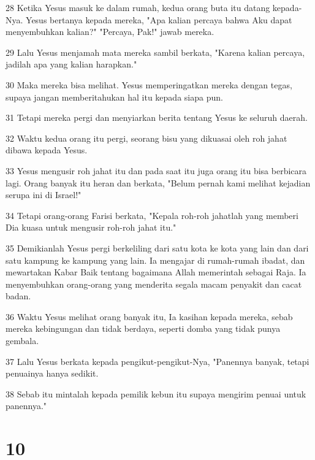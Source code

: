 \par 28 Ketika Yesus masuk ke dalam rumah, kedua orang buta itu datang kepada-Nya. Yesus bertanya kepada mereka, "Apa kalian percaya bahwa Aku dapat menyembuhkan kalian?" "Percaya, Pak!" jawab mereka.
\par 29 Lalu Yesus menjamah mata mereka sambil berkata, "Karena kalian percaya, jadilah apa yang kalian harapkan."
\par 30 Maka mereka bisa melihat. Yesus memperingatkan mereka dengan tegas, supaya jangan memberitahukan hal itu kepada siapa pun.
\par 31 Tetapi mereka pergi dan menyiarkan berita tentang Yesus ke seluruh daerah.
\par 32 Waktu kedua orang itu pergi, seorang bisu yang dikuasai oleh roh jahat dibawa kepada Yesus.
\par 33 Yesus mengusir roh jahat itu dan pada saat itu juga orang itu bisa berbicara lagi. Orang banyak itu heran dan berkata, "Belum pernah kami melihat kejadian serupa ini di Israel!"
\par 34 Tetapi orang-orang Farisi berkata, "Kepala roh-roh jahatlah yang memberi Dia kuasa untuk mengusir roh-roh jahat itu."
\par 35 Demikianlah Yesus pergi berkeliling dari satu kota ke kota yang lain dan dari satu kampung ke kampung yang lain. Ia mengajar di rumah-rumah ibadat, dan mewartakan Kabar Baik tentang bagaimana Allah memerintah sebagai Raja. Ia menyembuhkan orang-orang yang menderita segala macam penyakit dan cacat badan.
\par 36 Waktu Yesus melihat orang banyak itu, Ia kasihan kepada mereka, sebab mereka kebingungan dan tidak berdaya, seperti domba yang tidak punya gembala.
\par 37 Lalu Yesus berkata kepada pengikut-pengikut-Nya, "Panennya banyak, tetapi penuainya hanya sedikit.
\par 38 Sebab itu mintalah kepada pemilik kebun itu supaya mengirim penuai untuk panennya."

\chapter{10}

